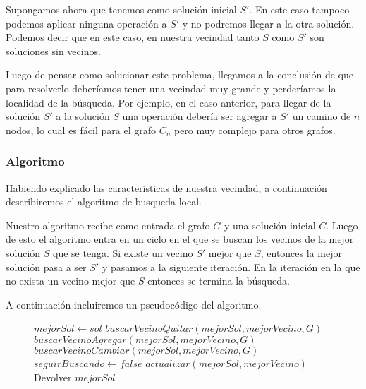 Supongamos ahora que tenemos como solución inicial $S'$. En este caso tampoco podemos aplicar ninguna operación a $S'$ y no podremos llegar a la otra solución. Podemos decir que en este caso, en nuestra vecindad tanto $S$ como $S'$ son soluciones sin vecinos.

Luego de pensar como solucionar este problema, llegamos a la conclusión de que para resolverlo deberíamos tener una vecindad muy grande y perderíamos la localidad de la búsqueda. Por ejemplo, en el caso anterior, para llegar de la solución $S'$ a la solución $S$ una operación debería ser agregar a $S'$ un camino de $n$ nodos, lo cual es fácil para el grafo $C_n$ pero muy complejo para otros grafos.

\subsubsection{Algoritmo}

Habiendo explicado las características de nuestra vecindad, a continuación describiremos el algoritmo de busqueda local.

Nuestro algoritmo recibe como entrada el grafo $G$ y una solución inicial $C$. Luego de esto el algoritmo entra en un ciclo en el que se buscan los vecinos de la mejor solución $S$ que se tenga. Si existe un vecino $S'$ mejor que $S$, entonces la mejor solución pasa a ser $S'$ y pasamos a la siguiente iteración. En la iteración en la que no exista un vecino mejor que $S$ entonces se termina la búsqueda.

A continuación incluiremos un pseudocódigo del algoritmo.
\begin{center}
 \begin{figure}[H]
  \begin{pseudo}
   \State $mejorSol \leftarrow sol$
      \State $buscarVecinoQuitar(mejorSol, mejorVecino, G)$
      \State $buscarVecinoAgregar(mejorSol, mejorVecino, G)$
      \State $buscarVecinoCambiar(mejorSol, mejorVecino, G)$
	\State $seguirBuscando \leftarrow false$
      \Else
	\State $actualizar(mejorSol, mejorVecino)$
      \EndIf
      \State Devolver $mejorSol$
   \EndWhile
   \EndProcedure
  \end{pseudo}
 \end{figure}
\end{center}

